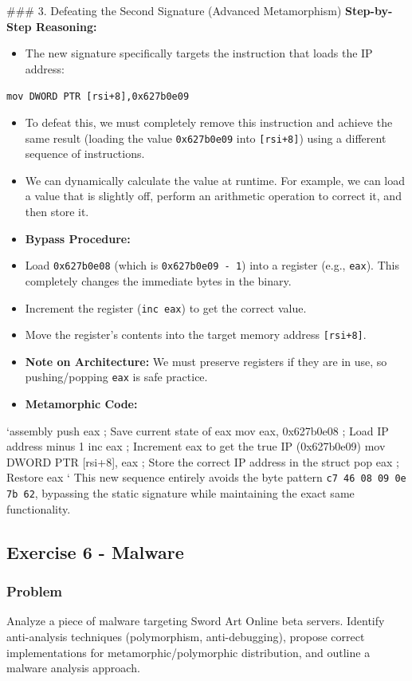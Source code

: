 \documentclass{article}
\begin{document}
\#\#\# 3. Defeating the Second Signature (Advanced Metamorphism)
\textbf{Step-by-Step Reasoning:}
\begin{itemize}
    \item The new signature specifically targets the instruction that loads the IP address:
\end{itemize}
\texttt{mov DWORD PTR [rsi+8],0x627b0e09}
\begin{itemize}
    \item To defeat this, we must completely remove this instruction and achieve the same result (loading the value \texttt{0x627b0e09} into \texttt{[rsi+8]}) using a different sequence of instructions.
    \item We can dynamically calculate the value at runtime. For example, we can load a value that is slightly off, perform an arithmetic operation to correct it, and then store it.
    \item \textbf{Bypass Procedure:}
    \item[\textbf{1.}] Load \texttt{0x627b0e08} (which is \texttt{0x627b0e09 - 1}) into a register (e.g., \texttt{eax}). This completely changes the immediate bytes in the binary.
    \item[\textbf{2.}] Increment the register (\texttt{inc eax}) to get the correct value.
    \item[\textbf{3.}] Move the register's contents into the target memory address \texttt{[rsi+8]}.
    \item \textbf{Note on Architecture:} We must preserve registers if they are in use, so pushing/popping \texttt{eax} is safe practice.
    \item \textbf{Metamorphic Code:}
\end{itemize}
\texttt{}`assembly
push eax                 ; Save current state of eax
mov eax, 0x627b0e08      ; Load IP address minus 1
inc eax                  ; Increment eax to get the true IP (0x627b0e09)
mov DWORD PTR [rsi+8], eax ; Store the correct IP address in the struct
pop eax                  ; Restore eax
\texttt{}`
This new sequence entirely avoids the byte pattern \texttt{c7 46 08 09 0e 7b 62}, bypassing the static signature while maintaining the exact same functionality.

\subsection{Exercise 6 - Malware}
\subsubsection*{Problem}
Analyze a piece of malware targeting Sword Art Online beta servers. Identify anti-analysis techniques (polymorphism, anti-debugging), propose correct implementations for metamorphic/polymorphic distribution, and outline a malware analysis approach.
\end{document}
